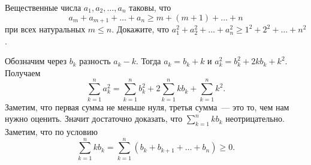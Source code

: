 \problem
Вещественные числа $a_1, a_2, \ldots, a_n$ таковы, что
\[
    a_m + a_{m + 1} + \ldots + a_n
\geq
    m + (m + 1) + \ldots + n
\]
при всех натуральных $m \leq n$.
Докажите, что $a_1^2 + a_2^2 + \ldots + a_n^2 \geq 1^2 + 2^2 + \ldots + n^2$.

\solution
Обозначим через $b_k$ разность $a_k - k$.
Тогда $a_k = b_k + k$ и $a_k^2 = b_k^2 + 2 k b_k + k^2$.
Получаем
\[
    \sum_{k = 1}^{n}
        a_k^2
=
    \sum_{k = 1}^n
        b_k^2
    +
    2 \sum_{k = 1}^{n}
        k b_k
    +
    \sum_{k = 1}^n
        k^2
.\]
Заметим, что первая сумма не меньше нуля, третья сумма~--- это то, чем нам
нужно оценить.
Значит достаточно доказать, что $\sum_{k = 1}^{n} k b_k$ неотрицательно.
Заметим, что по условию
\[
    \sum_{k = 1}^{n}
        k b_k
=
    \sum_{k = 1}^{n}
        (b_k + b_{k+1} + \ldots + b_n)
\geq
    0
.\]

\endproblem
